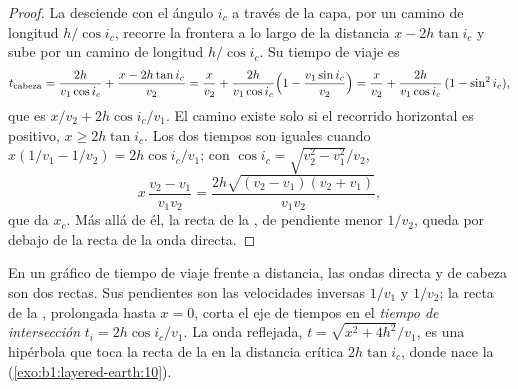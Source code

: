 \begin{proof}
La  desciende con el ángulo $i_c$ a través de la capa, por un camino de longitud $h/\cos i_c$, recorre la
frontera a lo largo de la distancia $x - 2h\tan i_c$ y sube por un camino de longitud $h/\cos i_c$. Su tiempo de viaje es
\[
  t_{\text{cabeza}} = \frac{2h}{v_1\cos i_c} + \frac{x - 2h\tan i_c}{v_2}
  = \frac{x}{v_2} + \frac{2h}{v_1\cos i_c}\Bigl(1 - \frac{v_1\sin i_c}{v_2}\Bigr)
  = \frac{x}{v_2} + \frac{2h}{v_1\cos i_c}\,(1 - \sin^2 i_c),
\]
que es $x/v_2 + 2h\cos i_c/v_1$. El camino existe solo si el recorrido horizontal es positivo, $x \ge 2h\tan i_c$. Los dos
tiempos son iguales cuando $x(1/v_1 - 1/v_2) = 2h\cos i_c/v_1$; con $\cos i_c = \sqrt{v_2^2 - v_1^2}/v_2$,
\[
  x\,\frac{v_2 - v_1}{v_1 v_2} = \frac{2h\sqrt{(v_2 - v_1)(v_2 + v_1)}}{v_1 v_2},
\]
que da $x_c$. Más allá de él, la recta de la , de pendiente menor $1/v_2$, queda por debajo de la recta
de la onda directa.
\end{proof}

En un gráfico de tiempo de viaje frente a distancia, las ondas directa y de cabeza son dos rectas. Sus pendientes son las
velocidades inversas $1/v_1$ y $1/v_2$; la recta de la , prolongada hasta $x = 0$, corta el eje de tiempos en el
\emph{tiempo de intersección} $t_i = 2h\cos i_c/v_1$. La onda reflejada,
$t = \sqrt{x^2 + 4h^2}/v_1$, es una hipérbola que toca la recta de la  en la distancia crítica $2h\tan i_c$,
donde nace la  (\cref{exo:b1:layered-earth:10}).

